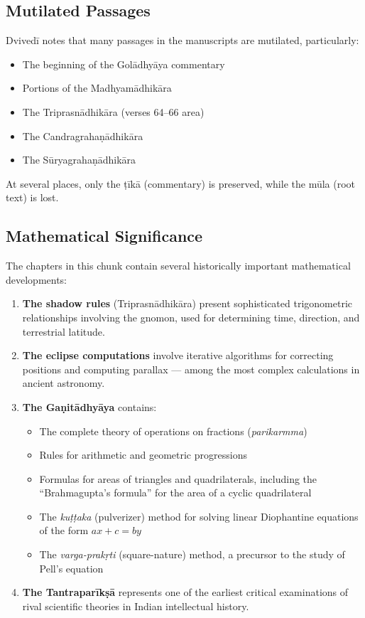 \documentclass[11pt,a4paper]{article}
\begin{document}
\subsection*{Mutilated Passages}

Dvivedī notes that many passages in the manuscripts are mutilated, particularly:
\begin{itemize}[label=\textbullet]
  \item The beginning of the Golādhyāya commentary
  \item Portions of the Madhyamādhikāra
  \item The Triprasnādhikāra (verses 64--66 area)
  \item The Candragrahaṇādhikāra
  \item The Sūryagrahaṇādhikāra
\end{itemize}

At several places, only the ṭīkā (commentary) is preserved, while the mūla
(root text) is lost.

\subsection*{Mathematical Significance}

The chapters in this chunk contain several historically important mathematical
developments:

\begin{enumerate}[label=\arabic*.]
  \item \textbf{The shadow rules} (Triprasnādhikāra) present sophisticated
  trigonometric relationships involving the gnomon, used for determining time,
  direction, and terrestrial latitude.

  \item \textbf{The eclipse computations} involve iterative algorithms for
  correcting positions and computing parallax --- among the most complex
  calculations in ancient astronomy.

  \item \textbf{The Gaṇitādhyāya} contains:
  \begin{itemize}
    \item The complete theory of operations on fractions (\textit{parikarmma})
    \item Rules for arithmetic and geometric progressions
    \item Formulas for areas of triangles and quadrilaterals, including the
    ``Brahmagupta's formula'' for the area of a cyclic quadrilateral
    \item The \textit{kuṭṭaka} (pulverizer) method for solving linear Diophantine
    equations of the form $ax + c = by$
    \item The \textit{varga-prakṛti} (square-nature) method, a precursor to the
    study of Pell's equation
  \end{itemize}

  \item \textbf{The Tantraparīkṣā} represents one of the earliest critical
  examinations of rival scientific theories in Indian intellectual history.
\end{enumerate}
\end{document}
